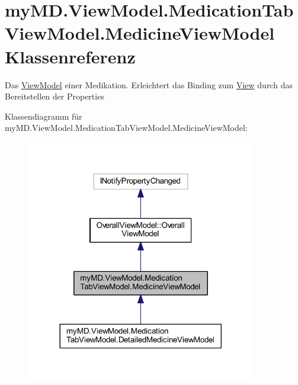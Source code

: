 \hypertarget{classmy_m_d_1_1_view_model_1_1_medication_tab_view_model_1_1_medicine_view_model}{}\section{my\+M\+D.\+View\+Model.\+Medication\+Tab\+View\+Model.\+Medicine\+View\+Model Klassenreferenz}
\label{classmy_m_d_1_1_view_model_1_1_medication_tab_view_model_1_1_medicine_view_model}


Das \mbox{\hyperlink{namespacemy_m_d_1_1_view_model}{View\+Model}} einer Medikation. Erleichtert das Binding zum \mbox{\hyperlink{namespacemy_m_d_1_1_view}{View}} durch das Bereitstellen der Properties  




Klassendiagramm für my\+M\+D.\+View\+Model.\+Medication\+Tab\+View\+Model.\+Medicine\+View\+Model\+:
\nopagebreak
\begin{figure}[H]
\begin{center}
\leavevmode
\includegraphics[width=284pt]{classmy_m_d_1_1_view_model_1_1_medication_tab_view_model_1_1_medicine_view_model__inherit__graph}
\end{center}
\end{figure}


